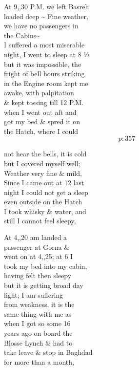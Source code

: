 \documentclass{report}
\begin{document}
	\par{
 	At 9,,30 P.M. we left Basreh\ \\loaded deep \~{} Fine weather,\ \\we have no passengers in\ \\the Cabins\~{}\ \\I suffered a most miserable\ \\night, I went to sleep at 8 ½\ \\but it was impossible, the\ \\fright of bell hours striking\ \\in the Engine room kept me\ \\awake, with palpitation\ \\\& kept tossing till 12 P.M.\ \\when I went out aft and\ \\got my bed \& spred it on\ \\the Hatch, where I could\ \\
  \[p: 357 \]

	}



	\par{
 	not hear the bells, it is cold\ \\but I covered myself well;\ \\Weather very fine \& mild,\ \\Since I came out at 12 last\ \\night I could not get a sleep\ \\even outside on the Hatch\ \\I took whisky \& water, and\ \\still I cannot feel sleepy,\ \\
	}

	\par{
 	At 4,,20 am landed a\ \\passenger at Gorna \&\ \\went on at 4,,25; at 6 I\ \\took my bed into my cabin,\ \\having felt then sleepy\ \\but it is getting broad day\ \\light; I am suffering\ \\from weakness, it is the\ \\same thing with me as\ \\when I got so some 16\ \\years ago on board the\ \\Blosse Lynch \& had to\ \\take leave \& stop in Baghdad\ \\for more than a month,\ \\
	}
\end{document}
